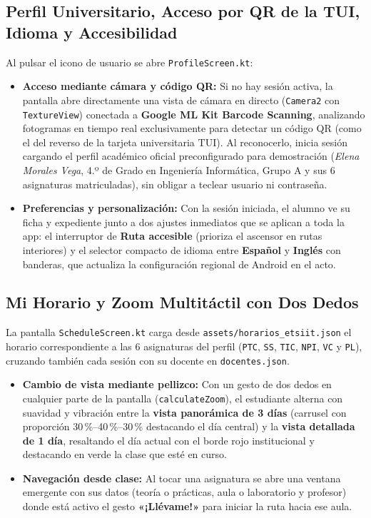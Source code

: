 \documentclass[11pt,a4paper]{article}
\begin{document}
\subsection{Perfil Universitario, Acceso por QR de la TUI, Idioma y Accesibilidad}
Al pulsar el icono de usuario se abre \texttt{ProfileScreen.kt}:
\begin{itemize}[leftmargin=1.8em]
    \item \textbf{Acceso mediante cámara y código QR:} Si no hay sesión activa, la pantalla abre directamente una vista de cámara en directo (\texttt{Camera2} con \texttt{TextureView}) conectada a \textbf{Google ML Kit Barcode Scanning}, analizando fotogramas en tiempo real exclusivamente para detectar un código QR (como el del reverso de la tarjeta universitaria TUI). Al reconocerlo, inicia sesión cargando el perfil académico oficial preconfigurado para demostración (\textit{Elena Morales Vega}, 4.º de Grado en Ingeniería Informática, Grupo A y sus 6 asignaturas matriculadas), sin obligar a teclear usuario ni contraseña.
    \item \textbf{Preferencias y personalización:} Con la sesión iniciada, el alumno ve su ficha y expediente junto a dos ajustes inmediatos que se aplican a toda la app: el interruptor de \textbf{Ruta accesible} (prioriza el ascensor en rutas interiores) y el selector compacto de idioma entre \textbf{Español} y \textbf{Inglés} con banderas, que actualiza la configuración regional de Android en el acto.
\end{itemize}

\subsection{Mi Horario y Zoom Multitáctil con Dos Dedos}
La pantalla \texttt{ScheduleScreen.kt} carga desde \texttt{assets/horarios\_etsiit.json} el horario correspondiente a las 6 asignaturas del perfil (\texttt{PTC}, \texttt{SS}, \texttt{TIC}, \texttt{NPI}, \texttt{VC} y \texttt{PL}), cruzando también cada sesión con su docente en \texttt{docentes.json}.
\begin{itemize}[leftmargin=1.8em]
    \item \textbf{Cambio de vista mediante pellizco:} Con un gesto de dos dedos en cualquier parte de la pantalla (\texttt{calculateZoom}), el estudiante alterna con suavidad y vibración entre la \textbf{vista panorámica de 3 días} (carrusel con proporción 30\,\%--40\,\%--30\,\% destacando el día central) y la \textbf{vista detallada de 1 día}, resaltando el día actual con el borde rojo institucional y destacando en verde la clase que esté en curso.
    \item \textbf{Navegación desde clase:} Al tocar una asignatura se abre una ventana emergente con sus datos (teoría o prácticas, aula o laboratorio y profesor) donde está activo el gesto \textbf{«¡Llévame!»} para iniciar la ruta hacia ese aula.
\end{itemize}
\end{document}
